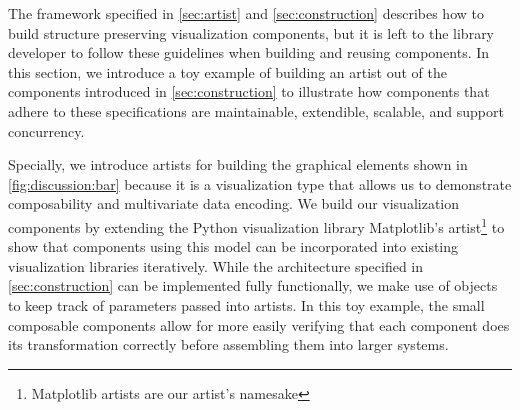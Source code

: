 \documentclass[journal]{IEEEtran}
\theoremstyle{definition}
\theoremstyle{remark}
\begin{document}
The framework specified in \autoref{sec:artist} and \autoref{sec:construction} describes how to build structure preserving visualization components, but it is left to the library developer to follow these guidelines when building and reusing components. In this section, we introduce a toy example of building an artist out of the components introduced in \autoref{sec:construction} to illustrate how components that adhere to these specifications are maintainable, extendible, scalable, and support concurrency.

\begin{figure}[H]
  \centering
  \label{fig:discussion:bar}
\end{figure}

Specially, we introduce artists for building the graphical elements shown in \autoref{fig:discussion:bar} because it is a visualization type that allows us to demonstrate composability and multivariate data encoding. We build our visualization components by extending the Python visualization library Matplotlib's artist\footnote{Matplotlib artists are our artist's namesake}\cite{hunterMatplotlib2DGraphics2007,hunterArchitectureOpenSource} to show that components using this model can be incorporated into existing visualization libraries iteratively. While the architecture specified in \autoref{sec:construction} can be implemented fully functionally, we make use of objects to keep track of parameters passed into artists. In this toy example, the small composable components allow for more easily verifying that each component does its transformation correctly before assembling them into larger systems.
\end{document}
